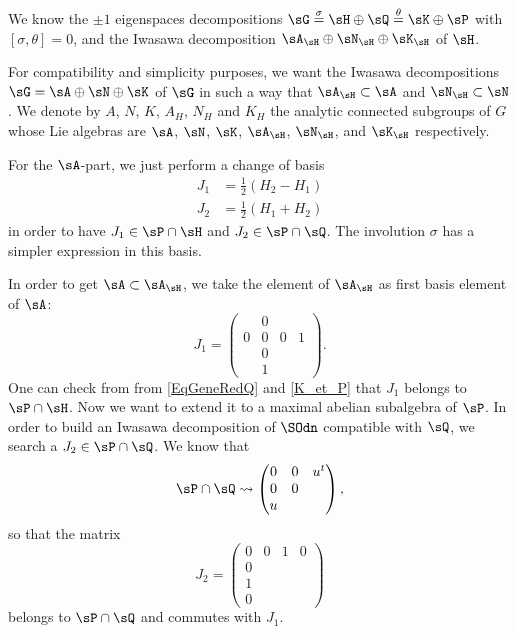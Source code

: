 We know the $\pm 1$ eigenspaces decompositions $\sG\stackrel{\sigma}{=}\sH\oplus\sQ\stackrel{\theta}{=}\sK\oplus\sP$ with $[\sigma,\theta]=0$, and the Iwasawa decomposition $\sA_{\sH}\oplus\sN_{\sH}\oplus\sK_{\sH}$ of $\sH$. 

For compatibility and simplicity purposes, we want the Iwasawa decompositions $\sG=\sA\oplus\sN\oplus\sK$ of $\sG$ in such a way that $\sA_{\sH}\subset\sA$ and $\sN_{\sH}\subset\sN$.
We denote by $A$, $N$, $K$, $A_H$, $N_H$ and $K_H$ the analytic connected subgroups of $G$ whose Lie algebras are $\sA$, $\sN$, $\sK$, $\sA_{\sH}$, $\sN_{\sH}$, and $\sK_{\sH}$ respectively. 


 For the $\sA$-part, we just perform a change of basis
\begin{subequations}
\begin{align}
J_{1}&=\frac{ 1 }{2}(H_{2}-H_{1})\\
J_{2}&=\frac{ 1 }{2}(H_{1}+H_{2}) 
\end{align}
\end{subequations}
in order to have $J_{1}\in\sP\cap\sH$ and $J_{2}\in\sP\cap\sQ$. The involution $\sigma$ has a simpler expression in this basis.

In order to get $\sA\subset\sA_{\sH}$, we take the element of $\sA_{\sH}$ as first basis element of $\sA$:
\begin{equation}		\label{EqGeueuleJun}
   J_1=
\begin{pmatrix}
&0\\
0&0&0&1\\
&0\\
&1
\end{pmatrix}.
\end{equation}
One can check from from \eqref{EqGeneRedQ} and \eqref{K_et_P} that $J_{1}$ belongs to $\sP\cap\sH$. Now we want to extend it to a maximal abelian subalgebra of $\sP$. In order to build an Iwasawa decomposition of $\SOdn$ compatible with $\sQ$, we search a $J_2\in\sP\cap\sQ$. We know that
\[
  \sP\cap\sQ\leadsto
\begin{pmatrix}
0&0&u^t\\
0&0\\
u
\end{pmatrix},
\]
so that the matrix
\begin{equation}		\label{EqgueueleJdeux}
J_2=
\begin{pmatrix}
0&0&1&0\\
0\\
1\\
0
\end{pmatrix}
\end{equation}
belongs to $\sP\cap\sQ$ and commutes with $J_1$. 

